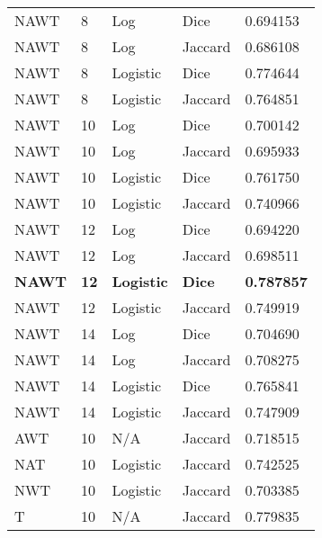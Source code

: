\documentclass{article}
\begin{document}
\begin{center}
	\scriptsize
    
    \tablelasttail{\hline}

      \begin{supertabular}{| l | l | l | l | l |}
            NAWT & 8 & Log & Dice & 0.694153 \\
            NAWT & 8 & Log & Jaccard & 0.686108 \\
            NAWT & 8 & Logistic & Dice & 0.774644 \\
            NAWT & 8 & Logistic & Jaccard & 0.764851 \\
            NAWT & 10 & Log & Dice & 0.700142 \\
            NAWT & 10 & Log & Jaccard & 0.695933 \\
            NAWT & 10 & Logistic & Dice & 0.761750 \\
            NAWT & 10 & Logistic & Jaccard & 0.740966 \\
            NAWT & 12 & Log & Dice & 0.694220 \\
            NAWT & 12 & Log & Jaccard & 0.698511 \\
            \textbf{NAWT} & \textbf{12} & \textbf{Logistic} & \textbf{Dice} & \textbf{0.787857} \\
            NAWT & 12 & Logistic & Jaccard & 0.749919 \\
            NAWT & 14 & Log & Dice & 0.704690 \\
            NAWT & 14 & Log & Jaccard & 0.708275 \\
            NAWT & 14 & Logistic & Dice & 0.765841 \\
            NAWT & 14 & Logistic & Jaccard & 0.747909 \\
            AWT & 10 & N/A & Jaccard & 0.718515 \\
            NAT & 10 & Logistic & Jaccard & 0.742525 \\
            NWT & 10 & Logistic & Jaccard & 0.703385 \\
            T & 10 & N/A & Jaccard & 0.779835 \\
         \hline
      \end{supertabular}
\end{center}
\end{document}
